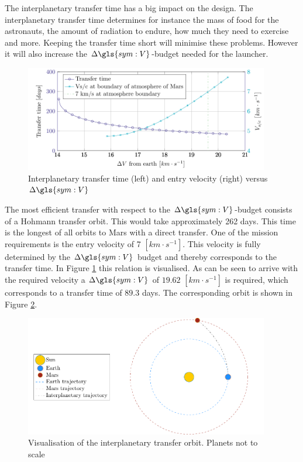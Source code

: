 The interplanetary transfer time has a big impact on the design. The interplanetary transfer time determines for instance the mass of food for the astronauts, the amount of radiation to endure, how much they need to exercise and more. Keeping the transfer time short will minimise these problems. However it will also increase the $\Delta\gls{sym:V}$-budget needed for the launcher. 

\begin{figure}[h]
	\centering
	\includegraphics[width=0.95\textwidth]{Figure/Inter_transfer/transfer_time.pdf}
	\caption[Interplanetary transfer time and entry velocity versus $\Delta\gls{sym:V}$]{Interplanetary transfer time (left) and entry velocity (right) versus $\Delta\gls{sym:V}$}
	\label{fig:inter_time}
\end{figure}

The most efficient transfer with respect to the $\Delta\gls{sym:V}$-budget consists of a Hohmann transfer orbit. This would take approximately 262 days. This time is the longest of all orbits to Mars with a direct transfer. One of the mission requirements is the entry velocity of 7 $\left[km \cdot s^{-1}\right]$. This velocity is fully determined by the $\Delta \gls{sym:V}$ budget and thereby corresponds to the transfer time. In Figure \ref{fig:inter_time} this relation is visualised. As can be seen to arrive with the required velocity a $\Delta \gls{sym:V}$ of $19.62$ $\left[km \cdot s^{-1}\right]$ is required, which corresponds to a transfer time of $89.3$ days. The corresponding orbit is shown in Figure \ref{fig:inter_orbit}.

\begin{figure}[h]
	\centering
	\includegraphics[width=0.95\textwidth]{Figure/Inter_transfer/orbits.pdf}
	\caption[Visualisation of the interplanetary transfer orbit]{Visualisation of the interplanetary transfer orbit. Planets not to scale}
	\label{fig:inter_orbit}
\end{figure}
